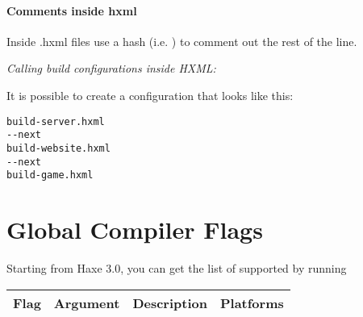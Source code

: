 \paragraph{Comments inside hxml}

Inside .hxml files use a hash (i.e. \ic{\#}) to comment out the rest of the line. 

\emph{Calling build configurations inside HXML:}

It is possible to create a configuration that looks like this:

\begin{lstlisting}
build-server.hxml  
--next  
build-website.hxml  
--next  
build-game.hxml
\end{lstlisting}


\section{Global Compiler Flags}
\label{compiler-usage-flags}

Starting from Haxe 3.0, you can get the list of supported  by running 

\begin{center}
\begin{tabular}{| l | l | l | l |}
	\hline
	Flag & Argument & Description & Platforms \\ \hline
	
\end{tabular}
\end{center}
